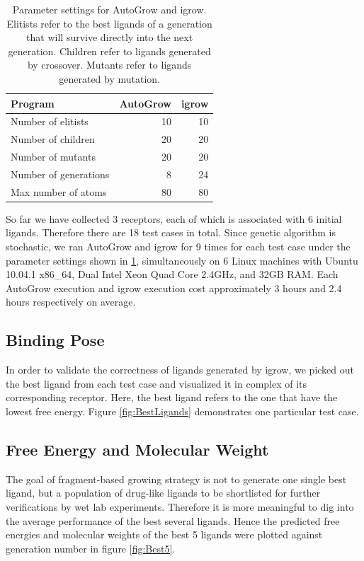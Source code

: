 \documentclass[10pt, conference, compsocconf]{../IEEEtran}
\begin{document}
\begin{table}
\centering
\begin{tabular*}
{\linewidth}
{@{\extracolsep{\fill}}lrr}
\noalign{\smallskip}\toprule
Program & AutoGrow & igrow\\
\midrule
\noalign{\smallskip}
Number of elitists & 10 & 10\\
Number of children & 20 & 20\\
Number of mutants & 20 & 20\\
Number of generations & 8 & 24\\
Max number of atoms & 80 & 80\\
\bottomrule
\end{tabular*}
\caption{Parameter settings for AutoGrow and igrow. Elitists refer to the best ligands of a generation that will survive directly into the next generation. Children refer to ligands generated by crossover. Mutants refer to ligands generated by mutation.}
\label{tab:ParameterSettings}
\end{table}

So far we have collected 3 receptors, each of which is associated with 6 initial ligands. Therefore there are 18 test cases in total. Since genetic algorithm is stochastic, we ran AutoGrow and igrow for 9 times for each test case under the parameter settings shown in \ref{tab:ParameterSettings}, simultaneously on 6 Linux machines with Ubuntu 10.04.1 x86\_64, Dual Intel Xeon Quad Core 2.4GHz, and 32GB RAM. Each AutoGrow execution and igrow execution cost approximately 3 hours and 2.4 hours respectively on average.

\subsection{Binding Pose}

In order to validate the correctness of ligands generated by igrow, we picked out the best ligand from each test case and visualized it in complex of its corresponding receptor. Here, the best ligand refers to the one that have the lowest free energy.
Figure \ref{fig:BestLigands} demonstrates one particular test case.

\subsection{Free Energy and Molecular Weight}

The goal of fragment-based growing strategy is not to generate one single best ligand, but a population of drug-like ligands to be shortlisted for further verifications by wet lab experiments. Therefore it is more meaningful to dig into the average performance of the best several ligands. Hence the predicted free energies and molecular weights of the best 5 ligands were plotted against generation number in figure \ref{fig:Best5}.
\end{document}
